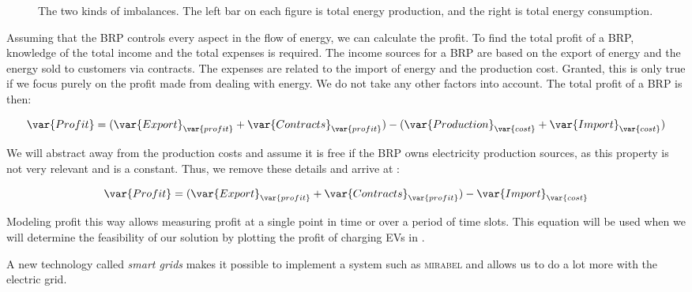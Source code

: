 \begin{figure}[htbp]
  \centering
  \caption{The two kinds of imbalances. The left bar on each figure is total energy production, and the right is total energy consumption.}\label{fig:negposImbalance}
\end{figure}

Assuming that the BRP controls every aspect in the flow of energy, we can calculate the profit. To find the total profit of a BRP, knowledge of the total income and the total expenses is required. The income sources for a BRP are based on the export of energy and the energy sold to customers via contracts. The expenses are related to the import of energy and the production cost. Granted, this is only true if we focus purely on the profit made from dealing with energy. We do not take any other factors into account. The total profit of a BRP is then:

\[
  \var{Profit} = (\var{Export}_{\var{profit}} + \var{Contracts}_{\var{profit}}) - (\var{Production}_{\var{cost}} +  \var{Import}_{\var{cost}})
\]

We will abstract away from the production costs and assume it is free if the BRP owns electricity production sources, as this property is not very relevant and is a constant. Thus, we remove these details and arrive at :

\begin{equation}\label{eq:profit}
  \var{Profit} = (\var{Export}_{\var{profit}} + \var{Contracts}_{\var{profit}}) - \var{Import}_{\var{cost}}
\end{equation}

Modeling profit this way allows measuring profit at a single point in time or over a period of time slots. This equation will be used when we will determine the feasibility of our solution by plotting the profit of charging EVs in .

A new technology called \emph{smart grids} makes it possible to implement a system such as \textsc{mirabel} and allows us to do a lot more with the electric grid.

